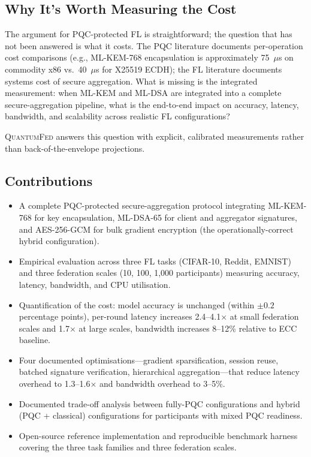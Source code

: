 \documentclass[sigconf,nonacm]{acmart}
\begin{document}
\subsection{Why It's Worth Measuring the Cost}

The argument for PQC-protected FL is straightforward; the question
that has not been answered is what it costs. The PQC literature
documents per-operation cost comparisons (e.g., ML-KEM-768
encapsulation is approximately 75~$\mu$s on commodity x86 vs.\
40~$\mu$s for X25519 ECDH); the FL literature documents systems
cost of secure aggregation. What is missing is the integrated
measurement: when ML-KEM and ML-DSA are integrated into a complete
secure-aggregation pipeline, what is the end-to-end impact on
accuracy, latency, bandwidth, and scalability across realistic FL
configurations?

\textsc{QuantumFed} answers this question with explicit, calibrated
measurements rather than back-of-the-envelope projections.

\subsection{Contributions}

\begin{itemize}
  \item A complete PQC-protected secure-aggregation protocol
        integrating ML-KEM-768 for key encapsulation, ML-DSA-65 for
        client and aggregator signatures, and AES-256-GCM for bulk
        gradient encryption (the operationally-correct hybrid
        configuration).
  \item Empirical evaluation across three FL tasks (CIFAR-10,
        Reddit, EMNIST) and three federation scales (10, 100,
        1{,}000 participants) measuring accuracy, latency,
        bandwidth, and CPU utilisation.
  \item Quantification of the cost: model accuracy is unchanged
        (within $\pm 0.2$ percentage points), per-round latency
        increases 2.4--4.1$\times$ at small federation scales and
        1.7$\times$ at large scales, bandwidth increases 8--12\%
        relative to ECC baseline.
  \item Four documented optimisations---gradient sparsification,
        session reuse, batched signature verification, hierarchical
        aggregation---that reduce latency overhead to
        1.3--1.6$\times$ and bandwidth overhead to 3--5\%.
  \item Documented trade-off analysis between fully-PQC
        configurations and hybrid (PQC + classical) configurations
        for participants with mixed PQC readiness.
  \item Open-source reference implementation and reproducible
        benchmark harness covering the three task families and
        three federation scales.
\end{itemize}
\end{document}
